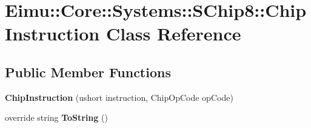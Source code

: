 \hypertarget{class_eimu_1_1_core_1_1_systems_1_1_s_chip8_1_1_chip_instruction}{
\section{Eimu::Core::Systems::SChip8::ChipInstruction Class Reference}
\label{class_eimu_1_1_core_1_1_systems_1_1_s_chip8_1_1_chip_instruction}
}
\subsection*{Public Member Functions}
\begin{DoxyCompactItemize}
\item 
\hypertarget{class_eimu_1_1_core_1_1_systems_1_1_s_chip8_1_1_chip_instruction_a6173941d6e176e7cfaccb3050e6fae0c}{
{\bfseries ChipInstruction} (ushort instruction, ChipOpCode opCode)}
\label{class_eimu_1_1_core_1_1_systems_1_1_s_chip8_1_1_chip_instruction_a6173941d6e176e7cfaccb3050e6fae0c}

\item 
\hypertarget{class_eimu_1_1_core_1_1_systems_1_1_s_chip8_1_1_chip_instruction_aec04969463cfaa7de9466d41d95cd047}{
override string {\bfseries ToString} ()}
\label{class_eimu_1_1_core_1_1_systems_1_1_s_chip8_1_1_chip_instruction_aec04969463cfaa7de9466d41d95cd047}

\end{DoxyCompactItemize}
